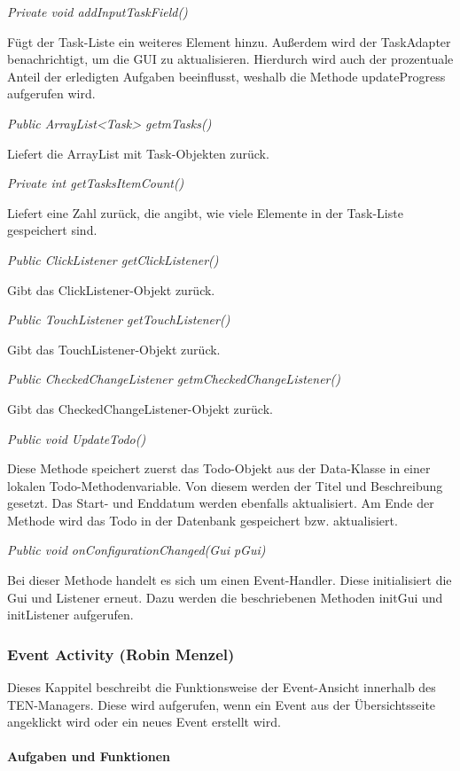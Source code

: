 \textit{Private void addInputTaskField()}

Fügt der Task-Liste ein weiteres Element hinzu. Außerdem wird der TaskAdapter benachrichtigt, um die GUI zu aktualisieren. Hierdurch wird auch der prozentuale Anteil der erledigten Aufgaben beeinflusst, weshalb die Methode updateProgress aufgerufen wird.

\textit{Public ArrayList<Task> getmTasks()}

Liefert die ArrayList mit Task-Objekten zurück.

\textit{Private int getTasksItemCount()}

Liefert eine Zahl zurück, die angibt, wie viele Elemente in der Task-Liste gespeichert sind.

\textit{Public ClickListener getClickListener()}

Gibt das ClickListener-Objekt zurück.

\textit{Public TouchListener getTouchListener()}

	Gibt das TouchListener-Objekt zurück.

\textit{Public CheckedChangeListener getmCheckedChangeListener()}

	Gibt das CheckedChangeListener-Objekt zurück.

\textit{Public void UpdateTodo()}

Diese Methode speichert zuerst das Todo-Objekt aus der Data-Klasse in einer lokalen Todo-Methodenvariable. Von diesem werden der Titel und Beschreibung gesetzt. Das Start- und Enddatum werden ebenfalls aktualisiert. Am Ende der Methode wird das Todo in der Datenbank gespeichert bzw. aktualisiert.

\textit{Public void onConfigurationChanged(Gui pGui)}

Bei dieser Methode handelt es sich um einen Event-Handler. Diese initialisiert die Gui und Listener erneut. Dazu werden die beschriebenen Methoden initGui und initListener aufgerufen.


\newpage
\subsubsection{Event Activity (Robin Menzel)}
Dieses Kappitel beschreibt die Funktionsweise der Event-Ansicht innerhalb des TEN-Managers. Diese wird aufgerufen, wenn ein Event aus der Übersichtsseite angeklickt wird oder ein neues Event erstellt wird.

\paragraph{Aufgaben und Funktionen}

